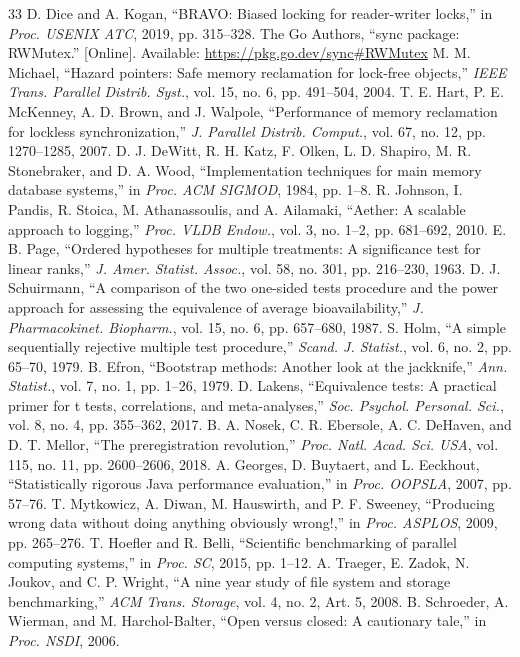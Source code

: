 \documentclass[conference]{IEEEtran}
\newif\ifwithappendix\withappendixtrue
\begin{document}
\begin{thebibliography}{33}
 D. Dice and A. Kogan, ``BRAVO: Biased locking for reader-writer locks,'' in \emph{Proc. USENIX ATC}, 2019, pp. 315--328.
 The Go Authors, ``sync package: RWMutex.'' [Online]. Available: \url{https://pkg.go.dev/sync#RWMutex}
 M. M. Michael, ``Hazard pointers: Safe memory reclamation for lock-free objects,'' \emph{IEEE Trans. Parallel Distrib. Syst.}, vol. 15, no. 6, pp. 491--504, 2004.
 T. E. Hart, P. E. McKenney, A. D. Brown, and J. Walpole, ``Performance of memory reclamation for lockless synchronization,'' \emph{J. Parallel Distrib. Comput.}, vol. 67, no. 12, pp. 1270--1285, 2007.
 D. J. DeWitt, R. H. Katz, F. Olken, L. D. Shapiro, M. R. Stonebraker, and D. A. Wood, ``Implementation techniques for main memory database systems,'' in \emph{Proc. ACM SIGMOD}, 1984, pp. 1--8.
 R. Johnson, I. Pandis, R. Stoica, M. Athanassoulis, and A. Ailamaki, ``Aether: A scalable approach to logging,'' \emph{Proc. VLDB Endow.}, vol. 3, no. 1--2, pp. 681--692, 2010.
 E. B. Page, ``Ordered hypotheses for multiple treatments: A significance test for linear ranks,'' \emph{J. Amer. Statist. Assoc.}, vol. 58, no. 301, pp. 216--230, 1963.
 D. J. Schuirmann, ``A comparison of the two one-sided tests procedure and the power approach for assessing the equivalence of average bioavailability,'' \emph{J. Pharmacokinet. Biopharm.}, vol. 15, no. 6, pp. 657--680, 1987.
 S. Holm, ``A simple sequentially rejective multiple test procedure,'' \emph{Scand. J. Statist.}, vol. 6, no. 2, pp. 65--70, 1979.
 B. Efron, ``Bootstrap methods: Another look at the jackknife,'' \emph{Ann. Statist.}, vol. 7, no. 1, pp. 1--26, 1979.
 D. Lakens, ``Equivalence tests: A practical primer for t tests, correlations, and meta-analyses,'' \emph{Soc. Psychol. Personal. Sci.}, vol. 8, no. 4, pp. 355--362, 2017.
 B. A. Nosek, C. R. Ebersole, A. C. DeHaven, and D. T. Mellor, ``The preregistration revolution,'' \emph{Proc. Natl. Acad. Sci. USA}, vol. 115, no. 11, pp. 2600--2606, 2018.
 A. Georges, D. Buytaert, and L. Eeckhout, ``Statistically rigorous Java performance evaluation,'' in \emph{Proc. OOPSLA}, 2007, pp. 57--76.
 T. Mytkowicz, A. Diwan, M. Hauswirth, and P. F. Sweeney, ``Producing wrong data without doing anything obviously wrong!,'' in \emph{Proc. ASPLOS}, 2009, pp. 265--276.
 T. Hoefler and R. Belli, ``Scientific benchmarking of parallel computing systems,'' in \emph{Proc. SC}, 2015, pp. 1--12.
 A. Traeger, E. Zadok, N. Joukov, and C. P. Wright, ``A nine year study of file system and storage benchmarking,'' \emph{ACM Trans. Storage}, vol. 4, no. 2, Art. 5, 2008.
 B. Schroeder, A. Wierman, and M. Harchol-Balter, ``Open versus closed: A cautionary tale,'' in \emph{Proc. NSDI}, 2006.
\end{thebibliography}

\ifwithappendix
\clearpage
\appendices

\fi
\end{document}
